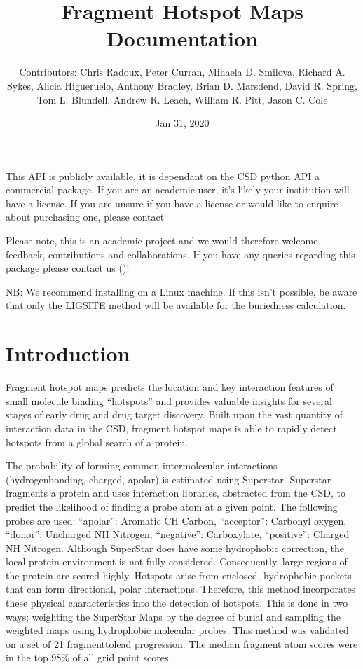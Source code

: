 \documentclass[letterpaper,10pt,english]{sphinxmanual}
\title{Fragment Hotspot Maps Documentation}
\date{Jan 31, 2020}
\author{Contributors: Chris Radoux, Peter Curran, Mihaela D. Smilova, Richard A. Sykes, Alicia Higueruelo, Anthony Bradley, Brian D. Marsdend, David R. Spring, Tom L. Blundell, Andrew R. Leach, William R. Pitt, Jason C. Cole}
\begin{document}
\pagestyle{empty}
\sphinxmaketitle
\pagestyle{plain}
\sphinxtableofcontents
\pagestyle{normal}
\label{\detokenize{index::doc}}


\noindent{}

This API is publicly available, it is dependant on the CSD python API \sphinxhyphen{} a commercial package.
If you are an academic user, it’s likely your institution will have a license. If you are unsure if you have a
license or would like to enquire about purchasing one, please contact 

Please note, this is an academic project and we would therefore welcome feedback, contributions and collaborations.
If you have any queries regarding this package please contact us ()!

NB: We recommend installing on a Linux machine. If this isn’t possible, be aware that only the LIGSITE method will be
available for the buriedness calculation.


\chapter{Introduction}
\label{\detokenize{tutorial:introduction}}\label{\detokenize{tutorial::doc}}
Fragment hotspot maps predicts the location and key interaction features of small molecule binding “hotspots” and
provides valuable insights for several stages of early drug and drug target discovery. Built upon the vast quantity of
interaction data in the CSD, fragment hotspot maps is able to rapidly detect hotspots from a global search of a
protein.

The probability of forming common intermolecular interactions (hydrogen\sphinxhyphen{}bonding, charged, apolar) is estimated using
Superstar. Superstar fragments a protein and uses interaction libraries, abstracted from the CSD, to predict the
likelihood of finding a probe atom at a given point. The following probes are used: “apolar”: Aromatic CH Carbon,
“acceptor”: Carbonyl oxygen, “donor”: Uncharged NH Nitrogen, “negative”: Carboxylate, “positive”: Charged NH Nitrogen.
Although SuperStar does have some hydrophobic correction, the local protein environment is not fully considered.
Consequently, large regions of the protein are scored highly. Hotspots arise from enclosed,
hydrophobic pockets that can form directional, polar interactions. Therefore, this method incorporates these physical
characteristics into the detection of hotspots. This is done in two ways; weighting the SuperStar Maps by the degree of
burial and sampling the weighted maps using hydrophobic molecular probes. This method was validated on a set of 21
fragment\sphinxhyphen{}to\sphinxhyphen{}lead progression. The median fragment atom scores were in the top 98\% of all grid point scores.
\end{document}
